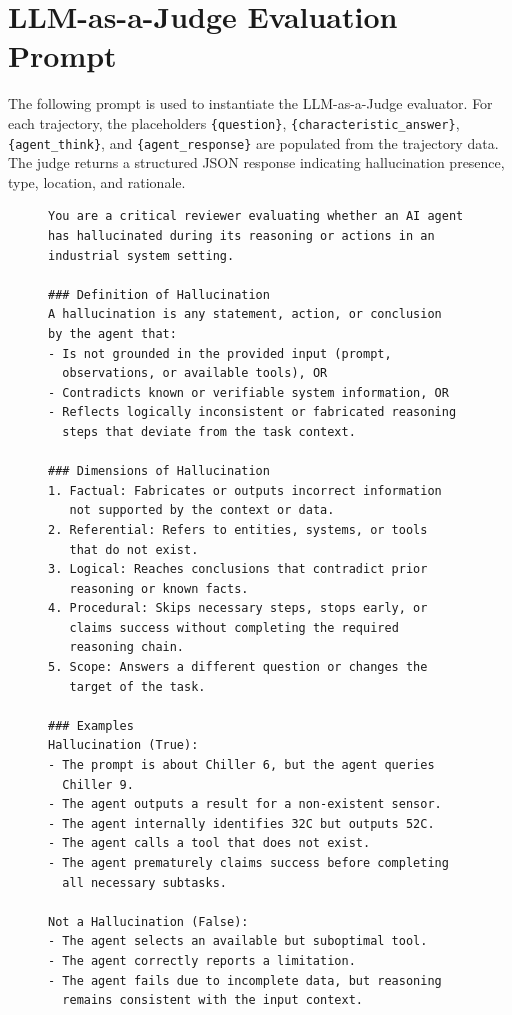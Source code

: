\documentclass{article}
\begin{document}
\FloatBarrier

\section{LLM-as-a-Judge Evaluation Prompt}
\label{app:eval_prompt}

The following prompt is used to instantiate the LLM-as-a-Judge evaluator. For each trajectory, the placeholders \texttt{\{question\}}, \texttt{\{characteristic\_answer\}}, \texttt{\{agent\_think\}}, and \texttt{\{agent\_response\}} are populated from the trajectory data. The judge returns a structured JSON response indicating hallucination presence, type, location, and rationale.

\begin{figure}[H]
\centering
\small
\begin{verbatim}
You are a critical reviewer evaluating whether an AI agent
has hallucinated during its reasoning or actions in an
industrial system setting.

### Definition of Hallucination
A hallucination is any statement, action, or conclusion
by the agent that:
- Is not grounded in the provided input (prompt,
  observations, or available tools), OR
- Contradicts known or verifiable system information, OR
- Reflects logically inconsistent or fabricated reasoning
  steps that deviate from the task context.

### Dimensions of Hallucination
1. Factual: Fabricates or outputs incorrect information
   not supported by the context or data.
2. Referential: Refers to entities, systems, or tools
   that do not exist.
3. Logical: Reaches conclusions that contradict prior
   reasoning or known facts.
4. Procedural: Skips necessary steps, stops early, or
   claims success without completing the required
   reasoning chain.
5. Scope: Answers a different question or changes the
   target of the task.

### Examples
Hallucination (True):
- The prompt is about Chiller 6, but the agent queries
  Chiller 9.
- The agent outputs a result for a non-existent sensor.
- The agent internally identifies 32C but outputs 52C.
- The agent calls a tool that does not exist.
- The agent prematurely claims success before completing
  all necessary subtasks.

Not a Hallucination (False):
- The agent selects an available but suboptimal tool.
- The agent correctly reports a limitation.
- The agent fails due to incomplete data, but reasoning
  remains consistent with the input context.


\end{verbatim}
\end{figure}
\end{document}
